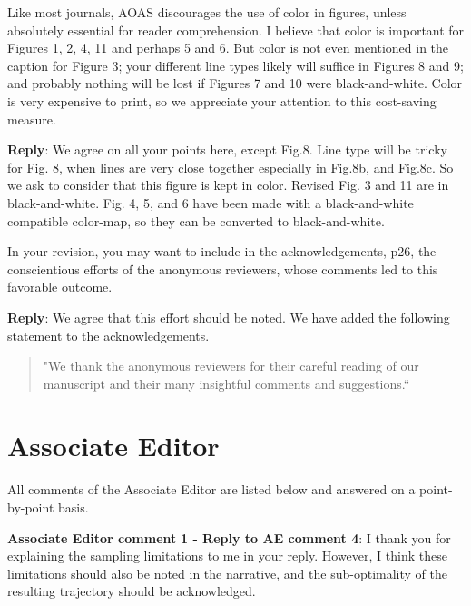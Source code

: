 \documentclass[a4paper]{article}
\newcounter{reviewer}
\def\aecom{\textbf{Associate Editor comment }}
\def\reply{\textbf{Reply}}
\begin{document}
\vspace{5mm}
 Like most journals, AOAS discourages the use of color in figures,
unless absolutely essential for reader comprehension.  I believe
that color is important for Figures 1, 2, 4, 11 and perhaps 5 and 6.
But color is not even mentioned in the caption for Figure 3; your
different line types likely will suffice in Figures 8 and 9; and
probably nothing will be lost if Figures 7 and 10 were black-and-white.
Color is very expensive to print, so we appreciate your attention
to this cost-saving measure.

\vspace{5mm}
\reply: We agree on all your points here, except Fig.8. Line type will be tricky for Fig. 8, when lines are very close together especially in Fig.8b, and Fig.8c. So we ask to consider that this figure is kept in color. Revised Fig. 3 and 11 are in black-and-white. Fig. 4, 5, and 6 have been made with a black-and-white compatible color-map, so they can be converted to black-and-white.

\vspace{5mm}
 In your revision, you may want to include in the
acknowledgements, p26, the conscientious efforts of the anonymous
reviewers, whose comments led to this favorable outcome.

\vspace{5mm}
\reply: We agree that this effort should be noted. We have added the following statement to the acknowledgements.

\begin{quote}
"We thank the anonymous reviewers for their careful reading of our manuscript and their many insightful comments and suggestions.``
\end{quote}

 \section*{Associate Editor}
All comments of the Associate Editor are listed below and answered on a point-by-point basis.

\setcounter{reviewer}{1}

\vspace{5mm}
\noindent \aecom \textbf{1 - Reply to AE comment 4}: 
I thank you for explaining the sampling limitations to me in your reply.  However, I think these limitations should also be noted in the narrative, and the sub-optimality of the resulting trajectory should be acknowledged.
\end{document}
